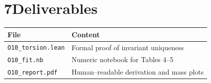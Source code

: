 \documentclass{article}
\begin{document}
\section*{7\quad Deliverables}
\begin{center}
\begin{tabular}{|l|l|}
\hline
File & Content\\\hline
\texttt{O10\_torsion.lean} & Formal proof of invariant uniqueness\\
\texttt{O10\_fit.nb} & Numeric notebook for Tables 4--5\\
\texttt{O10\_report.pdf} & Human--readable derivation and mass plots\\\hline
\end{tabular}
\end{center}
\end{document}

